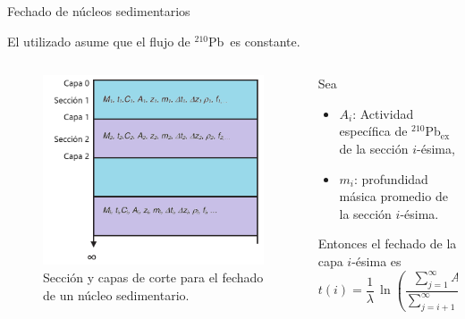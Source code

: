 \documentclass[9pt]{beamer}
\newcommand{\PbCero}{$^{210}$Pb}
\newcommand{\PbCeroEx}{$^{210}$Pb$_\text{ex}$}
\begin{document}
\begin{frame}{Fechado de núcleos sedimentarios}
\begin{center}
El \hyperlink{Fechado}{} utilizado asume que el flujo de \PbCero\, es constante.
 \end{center}

\begin{columns}
		\begin{column}{0.4\textwidth}
			\justifying
\begin{figure}
 \centering
 \includegraphics[width=\textwidth]{Imagenes/EsquemaNucleoSed-4.png}
 \caption{Sección y capas de corte para el fechado de un núcleo sedimentario\footnotemark[1].}
\end{figure}
		\end{column}
		\begin{column}{0.5\textwidth}  
			\justifying
			Sea 
			\begin{itemize}
			\item $A_i$: Actividad específica de \PbCeroEx\, de la sección $i$-ésima, 
			\item $m_i$: profundidad másica promedio de la sección $i$-ésima.
			\end{itemize}						
			Entonces el fechado de la capa $i$-ésima es
			\begin{equation}
t(i) = \dfrac{1}{\lambda}\,\ln\left(\dfrac{\sum_{j=1}^\infty A_j\, m_j}{ \sum_{j=i+1}^\infty A_j\, m_j}\right). 
			\end{equation}			

		\end{column}
	\end{columns}
\end{frame}
\end{document}
